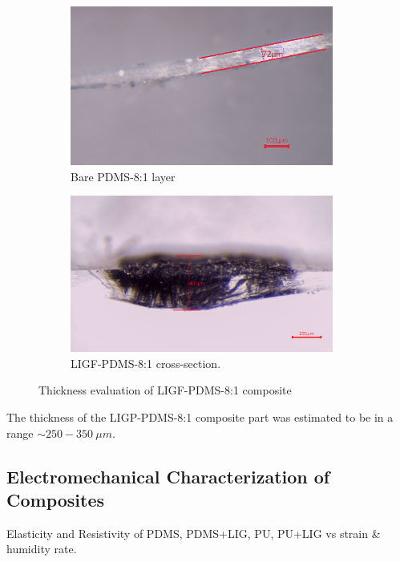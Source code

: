 \begin{figure}[H]
\begin{subfigure}{0.49\textwidth}
\includegraphics[width=0.95\textwidth]{Figures/Results/PDMS-1-layer-10-1-CS2.jpg} 
\captionsetup{width=0.9\linewidth}
\caption{Bare PDMS-8:1 layer}
\label{fig:PDMS-81-double-layer}
\end{subfigure}
\begin{subfigure}{0.49\textwidth}
\includegraphics[width=0.95\textwidth]{Figures/Results/LIG-Fiber-in-PDMS-1-layer-10-1-CS1.jpg}
\captionsetup{width=0.9\linewidth}
\caption{LIGF-PDMS-8:1 cross-section. }
\label{fig:LIGF-PDMS-cross-section}
\end{subfigure}
\medskip
\caption{Thickness evaluation of LIGF-PDMS-8:1 composite}
\label{fig:LIGP_BET}
\end{figure}

The thickness of the LIGP-PDMS-8:1 composite part was estimated to be in a range $\sim 250-350\:\mu m$.     


\subsection{Electromechanical Characterization of Composites}
Elasticity and Resistivity of PDMS, PDMS+LIG, PU, PU+LIG vs strain \& humidity rate.

